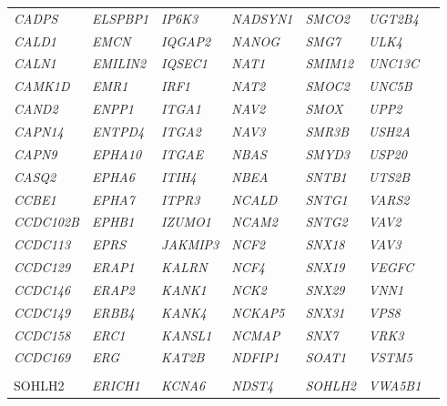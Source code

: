 \begin{refsection}
\begin{otherlanguage}{english}
\begin{scriptsize}
\begin{longtable}{lllllll}
\textit{CADPS} & \textit{ELSPBP1} & \textit{IP6K3} & \textit{NADSYN1} & \textit{SMCO2} & \textit{UGT2B4} & \textit{} \\
\textit{CALD1} & \textit{EMCN} & \textit{IQGAP2} & \textit{NANOG} & \textit{SMG7} & \textit{ULK4} & \textit{} \\
\textit{CALN1} & \textit{EMILIN2} & \textit{IQSEC1} & \textit{NAT1} & \textit{SMIM12} & \textit{UNC13C} & \textit{} \\
\textit{CAMK1D} & \textit{EMR1} & \textit{IRF1} & \textit{NAT2} & \textit{SMOC2} & \textit{UNC5B} & \textit{} \\
\textit{CAND2} & \textit{ENPP1} & \textit{ITGA1} & \textit{NAV2} & \textit{SMOX} & \textit{UPP2} & \textit{} \\
\textit{CAPN14} & \textit{ENTPD4} & \textit{ITGA2} & \textit{NAV3} & \textit{SMR3B} & \textit{USH2A} & \textit{} \\
\textit{CAPN9} & \textit{EPHA10} & \textit{ITGAE} & \textit{NBAS} & \textit{SMYD3} & \textit{USP20} & \textit{} \\
\textit{CASQ2} & \textit{EPHA6} & \textit{ITIH4} & \textit{NBEA} & \textit{SNTB1} & \textit{UTS2B} & \textit{} \\
\textit{CCBE1} & \textit{EPHA7} & \textit{ITPR3} & \textit{NCALD} & \textit{SNTG1} & \textit{VARS2} & \textit{} \\
\textit{CCDC102B} & \textit{EPHB1} & \textit{IZUMO1} & \textit{NCAM2} & \textit{SNTG2} & \textit{VAV2} & \textit{} \\
\textit{CCDC113} & \textit{EPRS} & \textit{JAKMIP3} & \textit{NCF2} & \textit{SNX18} & \textit{VAV3} & \textit{} \\
\textit{CCDC129} & \textit{ERAP1} & \textit{KALRN} & \textit{NCF4} & \textit{SNX19} & \textit{VEGFC} & \textit{} \\
\textit{CCDC146} & \textit{ERAP2} & \textit{KANK1} & \textit{NCK2} & \textit{SNX29} & \textit{VNN1} & \textit{} \\
\textit{CCDC149} & \textit{ERBB4} & \textit{KANK4} & \textit{NCKAP5} & \textit{SNX31} & \textit{VPS8} & \textit{} \\
\textit{CCDC158} & \textit{ERC1} & \textit{KANSL1} & \textit{NCMAP} & \textit{SNX7} & \textit{VRK3} & \textit{} \\
\textit{CCDC169} & \textit{ERG} & \textit{KAT2B} & \textit{NDFIP1} & \textit{SOAT1} & \textit{VSTM5} & \textit{} \\
\textit{\begin{tabular}[c]{@{}l@{}}CCDC169-\\ SOHLH2\end{tabular}} & \textit{ERICH1} & \textit{KCNA6} & \textit{NDST4} & \textit{SOHLH2} & \textit{VWA5B1} & \textit{} \\

\end{longtable}
\end{scriptsize}
\end{otherlanguage}
\end{refsection}
